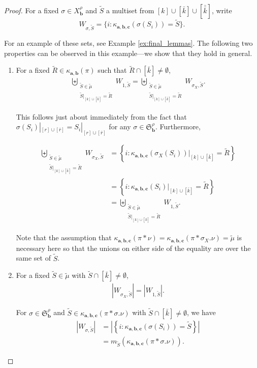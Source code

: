 \documentclass[10pt]{amsart}
\theoremstyle{definition}
\theoremstyle{definition}
\theoremstyle{plain}
\theoremstyle{remark}
\theoremstyle{plain}
\theoremstyle{plain}
\newcommand{\SG}{\mathfrak{S}}
\newcommand{\bfa}{{\boldsymbol{a}}}
\newcommand{\bfb}{{\boldsymbol{b}}}
\newcommand{\bfc}{{\boldsymbol{c}}}
\newcommand{\tmu}{{\tilde{\mu}}}
\newcommand{\tS}{{\tilde{S}}}
\newcommand{\tR}{{\tilde{R}}}
\newcommand{\ov}[1]{\bar{#1}}
\newcommand{\ovb}[1]{\left[\ov{#1}\right]}
\newcommand{\ovov}[1]{\bar{\bar{#1}}}
\newcommand{\ovovb}[1]{\left[\ovov{#1}\right]}
\newcommand{\abs}[1]{\left| #1\right |}
\begin{document}
\begin{proof}
For a fixed $\sigma\in X_\bfb^\rho$ and $\tS$ a multiset from $[k]\cup\ovb{k}\cup\ovovb{k}$, write \[W_{\sigma,\tS}=\{i:\kappa_{\bfa,\bfb,\bfc}(\sigma(S_i))=\tS\}.\]

For an example of these sets, see Example \ref{ex:final_lemmas}. The following two properties can be observed in this example---we show that they hold in general.

\begin{enumerate}
    \item[1.] For a fixed $\tR\in\kappa_{\bfa,\bfb}(\pi)$ such that $\tR\cap \ovb{k}\neq\emptyset$,\begin{align*}
    \biguplus_{\substack{\tS\in\tmu\\\tS|_{[k]\cup\ovb{k}}=\tR}}W_{1,\tS}=\biguplus_{\substack{\tS\in\tmu\\\tS|_{[k]\cup\ovb{k}}=\tR}}W_{\sigma_X,\tS}.
\end{align*}

This follows just about immediately from the fact that $\sigma(S_i)|_{[r]\cup\ovb{r}}=S_i|_{[r]\cup\ovb{r}}$ for any $\sigma\in \SG_\bfb^\rho$. Furthermore,

\begin{align*}
    \biguplus_{\substack{\tS\in\tmu\\\tS|_{[k]\cup\ovb{k}}=\tR}}W_{\sigma_X,\tS}&=\left\{i:\kappa_{\bfa,\bfb,\bfc}(\sigma_X(S_i))|_{[k]\cup\ovb{k}}=\tR\right\}\\
    &=\left\{i:\kappa_{\bfa,\bfb,\bfc}(S_i)|_{[k]\cup\ovb{k}}=\tR\right\}\\
    &=\biguplus_{\substack{\tS\in\tmu\\\tS|_{[k]\cup\ovb{k}}=\tR}}W_{1,\tS}.
\end{align*}

Note that the assumption that $\kappa_{\bfa,\bfb,\bfc}(\pi\ast\nu)=\kappa_{\bfa,\bfb,\bfc}(\pi\ast \sigma_X.\nu)=\tmu$ is necessary here so that the unions on either side of the equality are over the same set of $\tS$.

\item[2.] For a fixed $\tS\in\tmu$ with $\tS\cap\ovb{k}\neq\emptyset$, \begin{align*}
    |W_{\sigma_X,\tS}|=|W_{1,\tS}|.
\end{align*}

For $\sigma\in \SG_\bfb^\rho$ and $\tS\in\kappa_{\bfa,\bfb,\bfc}(\pi\ast\sigma.\nu)$ with $\tS\cap\ovb{k}\neq\emptyset$, we have
\begin{align*}
    \abs{W_{\sigma,\tS}}&=\abs{\left\{i:\kappa_{\bfa,\bfb,\bfc}(\sigma(S_i))=\tS\right\}}\\
    &=m_{\tS}(\kappa_{\bfa,\bfb,\bfc}(\pi\ast\sigma.\nu)).
\end{align*}


\end{enumerate}
\end{proof}
\end{document}
